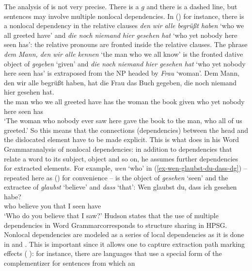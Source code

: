 The analysis of \citet{GO2009a} is not very precise. There is a $g$ and there is a dashed line, but
sentences may involve multiple nonlocal dependencies. In () for instance, there is a nonlocal dependency
in the relative clauses \emph{den wir alle begrüßt haben} `who we all greeted have' and \emph{die noch niemand hier
  gesehen hat} `who yet nobody here seen has': the relative pronouns are fronted inside the relative clauses. The phrase \emph{dem Mann, den wir alle
  kennen} `the man who we all know' is the fronted dative object of \emph{gegeben} `given' and \emph{die noch niemand hier gesehen
  hat} `who yet nobody here seen has' is extraposed from the NP headed by \emph{Frau} `woman'.
\ea
\gll Dem Mann, den wir alle begrüßt haben, hat die Frau das Buch gegeben, die noch niemand hier gesehen hat.\\
     the man   who we all greeted have      has the woman the book given who yet nobody here seen has\\
\glt `The woman  who nobody ever saw here gave the book to the man, who all of us greeted.'
\z
\largerpage[-1]
So this means that the connections (dependencies) between the head and the dislocated element have
to be made explicit. This is what \citet{Hudson97a,Hudson2000a} does in his Word
Grammar\indexwg analysis of nonlocal dependencies: in addition to dependencies that relate a word to
its subject, object and so on, he assumes further dependencies for extracted elements. For example,
\emph{wen} `who' in (\ref{ex-wen-glaubst-du-dass-dg}) -- repeated here as () for convenience -- is the object of \emph{gesehen} `seen' and the extractee of
\emph{glaubst} `believe' and \emph{dass} `that': 
\ea
\label{ex-wen-glaubst-du-dass-dg-two}
\gll Wen glaubst du, dass ich gesehen habe?\\
     who believe you that I seen have\\
\glt `Who do you believe that I saw?'
\z
Hudson states that the use of multiple dependencies in Word Grammar\indexwg corresponds to structure
sharing in HPSG\indexhpsg \citep[]{Hudson97a}. Nonlocal dependencies are modeled as a series
of local dependencies as it is done in \gpsg and \hpsg. This is important since it allows one to
capture extraction path marking effects 
(\citeauthor*{BMS2001a} \citeyear[--2, Section~3.2]{BMS2001a}):
for instance,
there are languages that use a special form of the complementizer for sentences from which an
